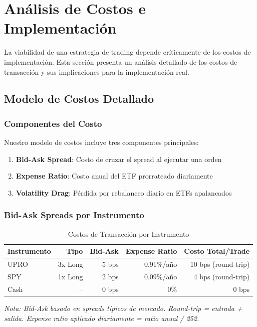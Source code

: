 
\section{An\'alisis de Costos e Implementaci\'on}
\label{sec:costs_implementation}

La viabilidad de una estrategia de trading depende cr\'iticamente de los costos de implementaci\'on. Esta secci\'on presenta un an\'alisis detallado de los costos de transacci\'on y sus implicaciones para la implementaci\'on real.

\subsection{Modelo de Costos Detallado}
\label{subsec:cost_model}

\subsubsection{Componentes del Costo}

Nuestro modelo de costos incluye tres componentes principales:

\begin{enumerate}
    \item \textbf{Bid-Ask Spread}: Costo de cruzar el spread al ejecutar una orden
    \item \textbf{Expense Ratio}: Costo anual del ETF prorrateado diariamente
    \item \textbf{Volatility Drag}: P\'erdida por rebalanceo diario en ETFs apalancados
\end{enumerate}

\subsubsection{Bid-Ask Spreads por Instrumento}

\begin{table}[htbp]
\centering
\caption{Costos de Transacci\'on por Instrumento}
\label{tab:tx_costs_detail}
\begin{tabular}{@{}lrrrr@{}}
\toprule
\textbf{Instrumento} & \textbf{Tipo} & \textbf{Bid-Ask} & \textbf{Expense Ratio} & \textbf{Costo Total/Trade} \\
\midrule
UPRO & 3x Long & 5 bps & 0.91\%/a\~no & 10 bps (round-trip) \\
SPY & 1x Long & 2 bps & 0.09\%/a\~no & 4 bps (round-trip) \\
Cash & -- & 0 bps & 0\% & 0 bps \\
\bottomrule
\end{tabular}
\vspace{0.2cm}
\small\textit{
\small
Nota: Bid-Ask basado en spreads t\'ipicos de mercado. Round-trip = entrada + salida. Expense ratio aplicado diariamente = ratio anual / 252.}
\end{table}


